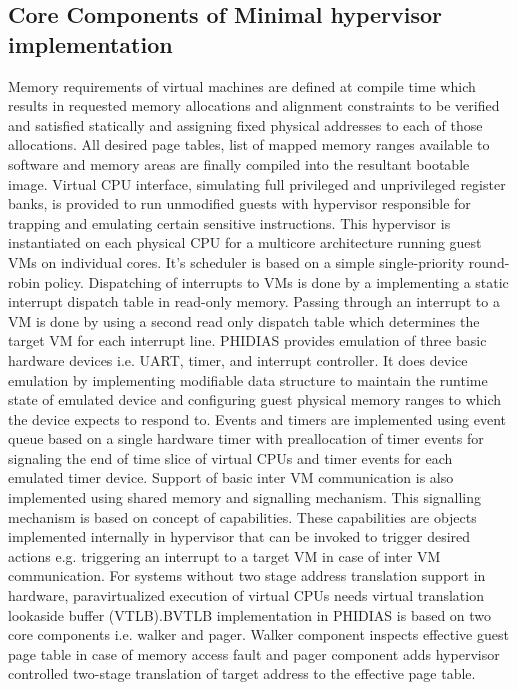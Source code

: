 \subsection{Core Components of Minimal hypervisor implementation}
Memory requirements of virtual machines are defined at compile time which results in requested memory allocations
and alignment constraints to be verified and satisfied statically and assigning fixed physical
addresses to each of those allocations. All desired page tables, list of mapped memory ranges available to software and memory areas are finally compiled into the resultant bootable image. Virtual CPU interface, simulating full privileged and unprivileged register banks, is provided to run unmodified guests with hypervisor responsible for trapping and emulating certain sensitive instructions. This hypervisor is instantiated on each physical CPU for a multicore architecture running guest VMs on individual cores. It's scheduler is based on a simple single-priority round-robin policy. Dispatching of interrupts to VMs is done by a implementing a static interrupt dispatch table in read-only memory. Passing through an interrupt to a VM is done by using a second read only dispatch table which determines the target VM  for each interrupt line. PHIDIAS provides emulation of three basic hardware devices i.e. UART, timer, and interrupt controller. It does device emulation by implementing modifiable data structure to maintain the runtime state of emulated device and configuring guest physical memory ranges to which the device expects to respond to. Events and timers are implemented using event queue based on a single hardware timer with preallocation of timer events for signaling the end of time slice of virtual CPUs and timer events for each emulated timer device. Support of basic inter VM communication is also implemented using shared memory and signalling mechanism. This signalling mechanism is based on concept of capabilities. These capabilities are objects implemented internally in hypervisor that can be invoked to trigger desired actions e.g. triggering an interrupt to a target VM in case of inter VM communication. For systems without two stage address translation support in hardware, paravirtualized execution of virtual CPUs needs virtual translation lookaside buffer (VTLB).BVTLB implementation in PHIDIAS is based on two core components i.e. walker and pager. Walker component inspects effective guest page table in case of memory access fault and pager component adds hypervisor controlled two-stage translation of target address to the effective page table.
